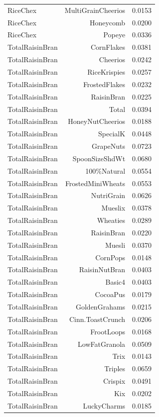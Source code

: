 \begin{longtable}{@{}lrr@{}}
RiceChex & MultiGrainCheerios & 0.0153 \\
RiceChex & Honeycomb & 0.0200 \\
RiceChex & Popeye & 0.0336 \\
TotalRaisinBran & CornFlakes & 0.0381 \\
TotalRaisinBran & Cheerios & 0.0242 \\
TotalRaisinBran & RiceKrispies & 0.0257 \\
TotalRaisinBran & FrostedFlakes & 0.0232 \\
TotalRaisinBran & RaisinBran & 0.0225 \\
TotalRaisinBran & Total & 0.0394 \\
TotalRaisinBran & HoneyNutCheerios & 0.0188 \\
TotalRaisinBran & SpecialK & 0.0448 \\
TotalRaisinBran & GrapeNuts & 0.0723 \\
TotalRaisinBran & SpoonSizeShdWt & 0.0680 \\
TotalRaisinBran & 100\%Natural & 0.0554 \\
TotalRaisinBran & FrostedMiniWheats & 0.0553 \\
TotalRaisinBran & NutriGrain & 0.0626 \\
TotalRaisinBran & Mueslix & 0.0378 \\
TotalRaisinBran & Wheaties & 0.0289 \\
TotalRaisinBran & RaisinBran & 0.0220 \\
TotalRaisinBran & Muesli & 0.0370 \\
TotalRaisinBran & CornPops & 0.0148 \\
TotalRaisinBran & RaisinNutBran & 0.0403 \\
TotalRaisinBran & Basic4 & 0.0403 \\
TotalRaisinBran & CocoaPus & 0.0179 \\
TotalRaisinBran & GoldenGrahams & 0.0215 \\
TotalRaisinBran & Cinn.ToastCrunch & 0.0206 \\
TotalRaisinBran & FrootLoops & 0.0168 \\
TotalRaisinBran & LowFatGranola & 0.0509 \\
TotalRaisinBran & Trix & 0.0143 \\
TotalRaisinBran & Triples & 0.0659 \\
TotalRaisinBran & Crispix & 0.0491 \\
TotalRaisinBran & Kix & 0.0202 \\
TotalRaisinBran & LuckyCharms & 0.0185 \\

\end{longtable}
